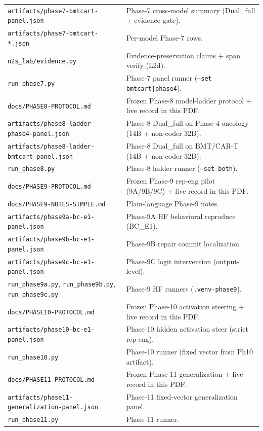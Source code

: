\documentclass[11pt,a4paper]{article}
\begin{document}
\begin{tabularx}{\textwidth}{@{}l Y@{}}
\texttt{artifacts/phase7-bmtcart-panel.json} & Phase-7 cross-model summary (Dual\_full + evidence gate). \\
\texttt{artifacts/phase7-bmtcart-*.json} & Per-model Phase-7 rows. \\
\texttt{n2s\_lab/evidence.py} & Evidence-preservation claims + span verify (L2d). \\
\texttt{run\_phase7.py} & Phase-7 panel runner (\texttt{--set bmtcart|phase4}). \\
\texttt{docs/PHASE8-PROTOCOL.md} & Frozen Phase-8 model-ladder protocol + live record in this PDF. \\
\texttt{artifacts/phase8-ladder-phase4-panel.json} & Phase-8 Dual\_full on Phase-4 oncology (14B + non-coder 32B). \\
\texttt{artifacts/phase8-ladder-bmtcart-panel.json} & Phase-8 Dual\_full on BMT/CAR-T (14B + non-coder 32B). \\
\texttt{run\_phase8.py} & Phase-8 ladder runner (\texttt{--set both}). \\
\texttt{docs/PHASE9-PROTOCOL.md} & Frozen Phase-9 rep-eng pilot (9A/9B/9C) + live record in this PDF. \\
\texttt{docs/PHASE9-NOTES-SIMPLE.md} & Plain-language Phase-9 notes. \\
\texttt{artifacts/phase9a-bc-e1-panel.json} & Phase-9A HF behavioral reproduce (BC\_E1). \\
\texttt{artifacts/phase9b-bc-e1-panel.json} & Phase-9B repair commit localization. \\
\texttt{artifacts/phase9c-bc-e1-panel.json} & Phase-9C logit intervention (output-level). \\
\texttt{run\_phase9a.py}, \texttt{run\_phase9b.py}, \texttt{run\_phase9c.py} & Phase-9 HF runners (\texttt{.venv-phase9}). \\
\texttt{docs/PHASE10-PROTOCOL.md} & Frozen Phase-10 activation steering + live record in this PDF. \\
\texttt{artifacts/phase10-bc-e1-panel.json} & Phase-10 hidden activation steer (strict rep-eng). \\
\texttt{run\_phase10.py} & Phase-10 runner (fixed vector from Ph10 artifact). \\
\texttt{docs/PHASE11-PROTOCOL.md} & Frozen Phase-11 generalization + live record in this PDF. \\
\texttt{artifacts/phase11-generalization-panel.json} & Phase-11 fixed-vector generalization panel. \\
\texttt{run\_phase11.py} & Phase-11 runner. \\

\end{tabularx}
\end{document}
